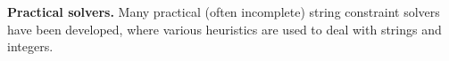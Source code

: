 \smallskip
\noindent
\textbf{Practical solvers.}
%
%
%
%
% 
Many practical (often incomplete) string constraint solvers have been developed, where various heuristics are used to deal with strings and integers. 

